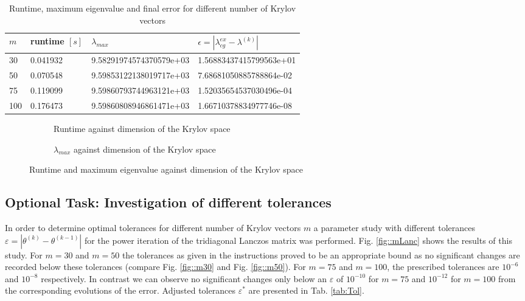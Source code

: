 \documentclass[11pt,a4paper]{article}
\newcommand{\refFig}[1]{Fig. \ref{#1}}
\newcommand{\refTab}[1]{Tab. \ref{#1}}
\begin{document}
\newpage
\renewcommand{\arraystretch}{2}
\begin{table}[h!]
	\begin{center}
		\begin{tabular}{ p{2cm} p{2cm} p{5cm} p{5cm}}
			\hline
			\hline
			$m$ & runtime $[s]$ & $\lambda_{max}$ & $\epsilon = |\lambda_{cg}^{ex} - \lambda^{(k)}|$ \\
			\hline
			\hline
			30 & 0.041932  & 9.58291974574370579e+03 & 1.56883437415799563e+01\\
			\hline
			50 & 0.070548  & 9.59853122138019717e+03 & 7.68681050885788864e-02\\
			\hline
			75 & 0.119099  & 9.59860793744963121e+03 & 1.52035654537030496e-04\\
			\hline
			100 & 0.176473   & 9.59860808946861471e+03  & 1.66710378834977746e-08\\
			\hline
			\hline
		\end{tabular}
		\caption{\label{tab:Lanc}  Runtime, maximum eigenvalue and final error for different number of Krylov vectors}
	\end{center}
\end{table}
\renewcommand{\arraystretch}{1}

\begin{figure}[h!]
	\centering
	\begin{subfigure}[h!]{.49\textwidth}
		\begin{center}
			\resizebox{0.52\width}{!}{}
			\caption{Runtime against dimension of the Krylov space}
			\label{fig::Lanc1}
		\end{center}	
	\end{subfigure}
	\hfill
	\begin{subfigure}[h!]{.49\textwidth}
		\centering
		\resizebox{0.52\width}{!}{}
		\caption{$\lambda_{max}$ against dimension of the Krylov space}
		\label{fig::Lanc2}
	\end{subfigure}
	\caption{Runtime and maximum eigenvalue against dimension of the Krylov space}
	\label{fig::Lanc}
\end{figure}

\subsection{Optional Task: Investigation of different tolerances}
In order to determine optimal tolerances for different number of Krylov vectors $m$ a parameter study with different tolerances $\varepsilon = |\theta^{(k)} - \theta^{(k-1)}|$ for the power iteration of the tridiagonal Lanczos matrix was performed. \refFig{fig::mLanc} shows the results of this study. For $m=30$ and $m=50$ the tolerances as given in the instructions proved to be an appropriate bound as no significant changes are recorded below these tolerances (compare \refFig{fig::m30} and \refFig{fig::m50}). For $m=75$ and $m=100$, the prescribed tolerances are $10^{-6}$ and $10^{-8}$ respectively. In contrast we can observe no significant changes only below an $\varepsilon$ of $10^{-10}$ for $m=75$ and $10^{-12}$ for $m=100$ from the corresponding evolutions of the error. Adjusted tolerances $\varepsilon^*$ are presented in \refTab{tab:Tol}.
\end{document}
